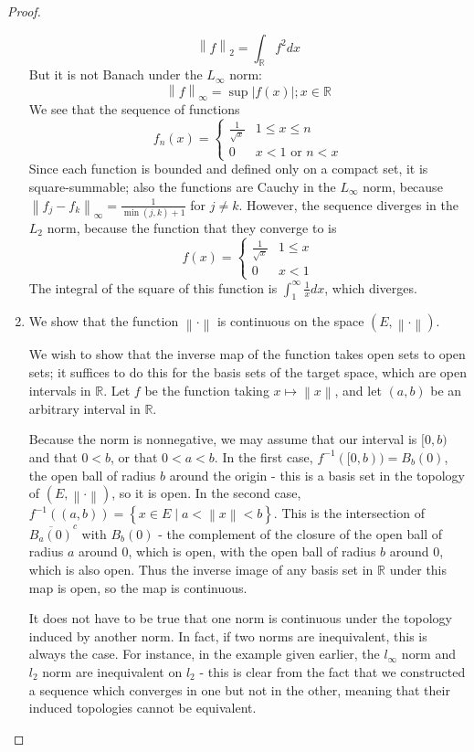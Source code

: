 \documentclass[12pt]{article}
\newcommand{\R}{\mathbb{R}}
\theoremstyle{definition}
\begin{document}
\begin{proof}
\begin{enumerate}[label=(\roman*)]
			\[ \left \lVert { f } \right \lVert_2  = \int_\R f^2 dx\]
		But it is not Banach under the $L_\infty$ norm:
		\[ \left \lVert { f } \right \lVert _\infty = \sup{\left \lvert { f(x) } \right \lvert ; x \in \R}\]			We see that the sequence of functions
		\[f_n(x) = \begin{cases}
				\frac{1}{\sqrt{x}} & 1 \leq x \leq n\\
				0 & x < 1 \text{ or } n < x
	\end{cases}\]
	Since each function is bounded and defined only on a compact set, it is square-summable; also the functions are Cauchy in the $L_\infty$ norm, because $\left \lVert { f_j - f_k } \right \lVert _\infty = \frac{1}{\min(j, k) + 1}$ for $j \neq k$. However, the sequence diverges in the $L_2$ norm, because the function that they converge to is
	\[f(x) = \begin{cases}
			\frac{1}{\sqrt{x}} & 1 \leq x\\
			0 & x < 1
	\end{cases}
\]
The integral of the square of this function is $\int_1^\infty \frac{1}{x} dx$, which diverges.
	\item We show that the function $\left \lVert {  \cdot } \right \lVert $ is continuous on the space $(E, \left \lVert {  \cdot } \right \lVert )$.
		\par We wish to show that the inverse map of the function takes open sets to open sets; it suffices to do this for the basis sets of the target space, which are open intervals in $\R$. Let $f$ be the function taking $x \mapsto \left \lVert { x } \right \lVert $, and let $(a, b)$ be an arbitrary interval in $\R$.
		\par Because the norm is nonnegative, we may assume that our interval is $[0,b)$ and that $0 < b$, or that $0 < a < b$. In the first case, $f^{-1}([0,b)) = B_b(0)$, the open ball of radius $b$ around the origin - this is a basis set in the topology of $(E, \left \lVert { \cdot } \right \lVert )$, so it is open. In the second case, $f^{-1}( (a,b)) = \left\{ x \in E \; \lvert \;  a < \left \lVert { x } \right \lVert < b \right\}$. This is the intersection of $\overline{B_a(0)}^c$ with $B_b(0)$ - the complement of the closure of the open ball of radius $a$ around $0$, which is open, with the open ball of radius $b$ around $0$, which is also open. Thus the inverse image of any basis set in $\R$ under this map is open, so the map is continuous.
	\par	It does not have to be true that one norm is continuous under the topology induced by another norm. In fact, if two norms are inequivalent, this is always the case. For instance, in the example given earlier, the $l_\infty$ norm and $l_2$ norm are inequivalent on $l_2$ - this is clear from the fact that we constructed a sequence which converges in one but not in the other, meaning that their induced topologies cannot be equivalent.
	\end{enumerate}
\end{proof}
\end{document}
